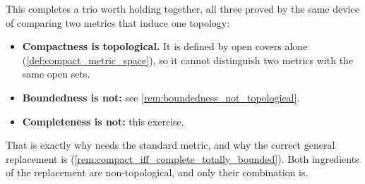\begin{exercisesolution}
\begin{remark}
This completes a trio worth holding together, all three proved by the same device of comparing
two metrics that induce one topology:
\begin{itemize}
  \item \textbf{Compactness is topological.} It is defined by open covers alone
    (\cref{def:compact_metric_space}), so it cannot distinguish two metrics with the same open
    sets.
  \item \textbf{Boundedness is not:} see \cref{rem:boundedness_not_topological}.
  \item \textbf{Completeness is not:} this exercise.
\end{itemize}
That is exactly why  needs the standard metric, and
why the correct general replacement is 
(\cref{rem:compact_iff_complete_totally_bounded}). Both ingredients of the replacement are
non-topological, and only their combination is.
\end{remark}
\end{exercisesolution}


